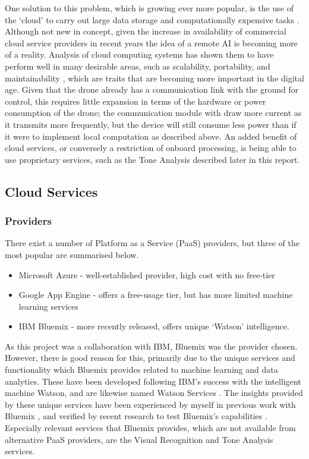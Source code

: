 \documentclass{article}
\begin{document}
\vspace{\baselineskip} \noindent
One solution to this problem, which is growing ever more popular, is the use of the `cloud' to carry out large data storage and computationally expensive tasks \cite{Cloud Robotics}. Although not new in concept, given the increase in availability of commercial cloud service providers in recent years the idea of a remote AI is becoming more of a reality. Analysis of cloud computing systems has shown them to have perform well in many desirable areas, such as scalability, portability, and maintainability \cite{Software Architecture}, which are traits that are becoming more important in the digital age. Given that the drone already has a communication link with the ground for control, this requires little expansion in terms of the hardware or power consumption of the drone; the communication module with draw more current as it transmits more frequently, but the device will still consume less power than if it were to implement local computation as described above. An added benefit of cloud services, or conversely a restriction of onboard processing, is being able to use proprietary services, such as the Tone Analysis described later in this report.

\subsection{Cloud Services}
\subsubsection{Providers}
There exist a number of Platform as a Service (PaaS) providers, but three of the most popular are summarised below.
\begin{itemize}
    \item Microsoft Azure - well-established provider, high cost with no free-tier
    \item Google App Engine - offers a free-usage tier, but has more limited machine learning services
    \item IBM Bluemix - more recently released, offers unique `Watson' intelligence.
\end{itemize}
As this project was a collaboration with IBM, Bluemix was the provider chosen. However, there is good reason for this, primarily due to the unique services and functionality which Bluemix provides related to machine learning and data analytics. These have been developed following IBM's success with the intelligent machine Watson, and are likewise named Watson Services \cite{Watson}. The insights provided by these unique services have been experienced by myself in previous work with Bluemix \cite{EdgeOfSpace}, and verified by recent research to test Bluemix's capabilities \cite{Sentiment}. Especially relevant services that Bluemix provides, which are not available from alternative PaaS providers, are the Visual Recognition and Tone Analysis services.
\end{document}
